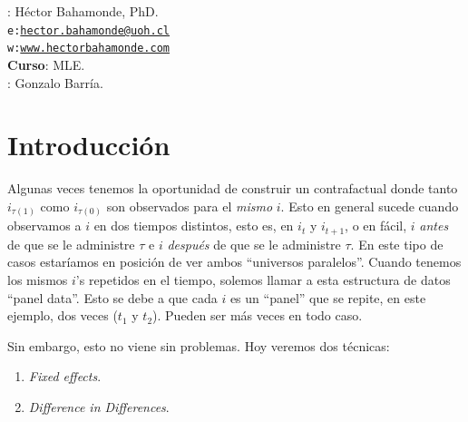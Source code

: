 \documentclass[onesided]{article}\usepackage[]{graphicx}\usepackage[]{color}
\begin{document}











\hspace{-5mm}{\bf Profesor}: H\'ector Bahamonde, PhD.\\
\texttt{e:}\href{mailto:hector.bahamonde@uoh.cl}{\texttt{hector.bahamonde@uoh.cl}}\\
\texttt{w:}\href{http://www.hectorbahamonde.com}{\texttt{www.hectorbahamonde.com}}\\
{\bf Curso}: MLE.\\
\hspace{-5mm}{\bf TA}: Gonzalo Barr\'ia.

\section{Introducci\'on}

Algunas veces tenemos la oportunidad de construir un contrafactual donde tanto $i_{\tau(1)}$ como $i_{\tau(0)}$ son observados para el \emph{mismo} $i$. Esto en general sucede cuando observamos a $i$ en dos tiempos distintos, esto es, en $i_{t}$ y $i_{t+1}$, o en f\'acil, $i$ \emph{antes} de que se le administre $\tau$ e $i$ \emph{despu\'es} de que se le administre $\tau$. En este tipo de casos estar\'iamos en posici\'on de ver ambos ``universos paralelos''. Cuando tenemos los mismos $i$'s repetidos en el tiempo, solemos llamar a esta estructura de datos ``panel data''. Esto se debe a que cada $i$ es un ``panel'' que se repite, en este ejemplo, dos veces ($t_{1}$ y $t_{2}$). Pueden ser m\'as veces en todo caso.

Sin embargo, esto no viene sin problemas. Hoy veremos dos t\'ecnicas:

\begin{enumerate}
  \item \emph{Fixed effects}.
  \item \emph{Difference in Differences}.
\end{enumerate}
\end{document}
